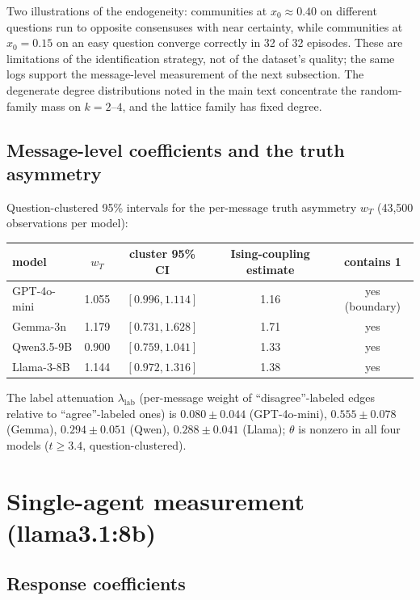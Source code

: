 \documentclass[11pt]{article}
\begin{document}
Two illustrations of the endogeneity: communities at $x_0 \approx 0.40$ on
different questions run to opposite consensuses with near certainty, while
communities at $x_0 = 0.15$ on an easy question converge correctly in 32 of
32 episodes. These are limitations of the identification strategy, not of
the dataset's quality; the same logs support the message-level measurement
of the next subsection. The degenerate degree distributions noted in the
main text concentrate the random-family mass on $k = 2$--$4$, and the
lattice family has fixed degree.

\subsection{Message-level coefficients and the truth asymmetry}

Question-clustered 95\% intervals for the per-message truth asymmetry $w_T$
(43{,}500 observations per model):

\begin{center}
\begin{tabular}{lcccc}
\toprule
model & $w_T$ & cluster 95\% CI & Ising-coupling estimate & contains 1 \\
\midrule
GPT-4o-mini & 1.055 & $[0.996, 1.114]$ & 1.16 & yes (boundary) \\
Gemma-3n    & 1.179 & $[0.731, 1.628]$ & 1.71 & yes \\
Qwen3.5-9B  & 0.900 & $[0.759, 1.041]$ & 1.33 & yes \\
Llama-3-8B  & 1.144 & $[0.972, 1.316]$ & 1.38 & yes \\
\bottomrule
\end{tabular}
\end{center}

The label attenuation $\lambda_{\mathrm{lab}}$ (per-message weight of
``disagree''-labeled edges relative to ``agree''-labeled ones) is
$0.080 \pm 0.044$ (GPT-4o-mini), $0.555 \pm 0.078$ (Gemma), $0.294 \pm 0.051$
(Qwen), $0.288 \pm 0.041$ (Llama); $\theta$ is nonzero in all four models
($t \ge 3.4$, question-clustered).

\section{Single-agent measurement (llama3.1:8b)}

\subsection{Response coefficients}
\begin{center}

\end{center}
\end{document}

